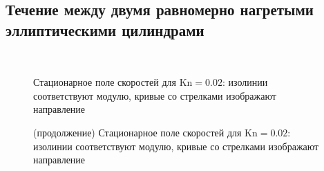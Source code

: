 \documentclass[
aps,%
12pt,%
final,%
notitlepage,%
oneside,%
onecolumn,%
nobibnotes,%
nofootinbib,%
superscriptaddress,%
noshowpacs,%
showkeys,%
floatfix,%
tightenlines,%
centertags]%
{revtex4}
\newcommand{\Kn}{\mathrm{Kn}}
\begin{document}
\subsection{Течение между двумя равномерно нагретыми эллиптическими цилиндрами}

\begin{figure}
    \centering
    \\
    \caption{Стационарное поле скоростей для \(\Kn=0.02\):
        изолинии соответствуют модулю, кривые со стрелками изображают направление}
\end{figure}

\begin{figure}
    \ContinuedFloat %
    \caption{(продолжение) Стационарное поле скоростей для \(\Kn=0.02\):
        изолинии соответствуют модулю, кривые со стрелками изображают направление}
    \label{fig:elliptic:flow}
\end{figure}
\end{document}
